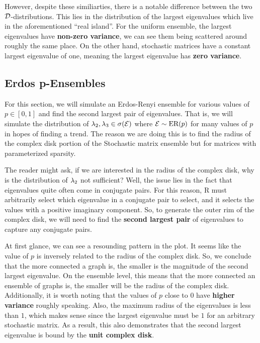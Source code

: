 However, despite these similiarties, there is a notable difference between the two $\mathcal{D}$-distributions. This lies in the distribution of the largest eigenvalues which live in the aforementioned ``real island''. For the uniform ensemble, the largest eigenvalues have \textbf{non-zero variance}, we can see them being scattered around roughly the same place. On the other hand, stochastic matrices have a constant largest eigenvalue of one, meaning the largest eigenvalue has \textbf{zero variance}.

\newpage

\subsection{Erdos p-Ensembles}

For this section, we will simulate an Erdos-Renyi ensemble for various values of $p \in [0,1]$ and find the second largest pair of eigenvalues.
That is, we will simulate the distribution of $\lambda_2,\lambda_3 \in \sigma(\mathcal{E})$ where $\mathcal{E} \sim \text{ER}(p)$ for many values of $p$ in hopes of finding a trend.
The reason we are doing this is to find the radius of the complex disk portion of the Stochastic matrix ensemble but for matrices with parameterized sparsity.

\begin{remark}
  The reader might ask, if we are interested in the radius of the complex disk, why is the distribution of $\lambda_2$ not sufficient? Well, the issue lies in the fact that eigenvalues quite often come in conjugate pairs. For this reason, R must arbitrarily select which eigenvalue in a conjugate pair to select, and it selects the values with a positive imaginary component. So, to generate the outer rim of the complex disk, we will need to find the \textbf{second largest pair} of eigenvalues to capture any conjugate pairs.
\end{remark}


At first glance, we can see a resounding pattern in the plot. It seems like the value of $p$ is inversely related to the radius of the complex disk. So, we conclude that the more connected a graph is, the smaller is the magnitude of the second largest eigenvalue. On the ensemble level, this means that the more connected an ensemble of graphs is, the smaller will be the radius of the complex disk. Additionally, it is worth noting that the values of $p$ close to $0$ have \textbf{higher variance} roughly speaking. Also, the maximum radius of the eigenvalues is less than $1$, which makes sense since the largest eigenvalue must be $1$ for an arbitrary stochastic matrix. As a result, this also demonstrates that the second largest eigenvalue is bound by the \textbf{unit complex disk}.


